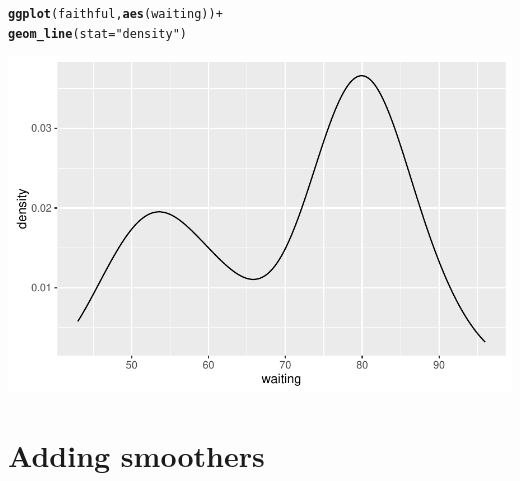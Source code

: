 \documentclass{beamer}\usepackage[]{graphicx}\usepackage[]{color}
\makeatletter
\newcommand{\hlstr}[1]{\textcolor[rgb]{0.192,0.494,0.8}{#1}}%
\newcommand{\hlopt}[1]{\textcolor[rgb]{0,0,0}{#1}}%
\newcommand{\hlstd}[1]{\textcolor[rgb]{0.345,0.345,0.345}{#1}}%
\newcommand{\hlkwc}[1]{\textcolor[rgb]{0.333,0.667,0.333}{#1}}%
\newcommand{\hlkwd}[1]{\textcolor[rgb]{0.737,0.353,0.396}{\textbf{#1}}}%
\newenvironment{kframe}{%
 \def\at@end@of@kframe{}%
 \ifinner\ifhmode%
  \def\at@end@of@kframe{\end{minipage}}%
  \begin{minipage}{\columnwidth}%
 \fi\fi%
 \def\FrameCommand##1{\hskip\@totalleftmargin \hskip-\fboxsep
 \colorbox{shadecolor}{##1}\hskip-\fboxsep
     \hskip-\linewidth \hskip-\@totalleftmargin \hskip\columnwidth}%
 \MakeFramed {\advance\hsize-\width
   \@totalleftmargin\z@ \linewidth\hsize
   \@setminipage}}%
 {\par\unskip\endMakeFramed%
 \at@end@of@kframe}
\newenvironment{knitrout}{}{} %
\makeatother
\begin{document}

\begin{frame}[fragile]
\begin{knitrout}\footnotesize
{}\color{fgcolor}\begin{kframe}
\begin{alltt}
\hlkwd{ggplot}\hlstd{(faithful,} \hlkwd{aes}\hlstd{(waiting))} \hlopt{+}
    \hlkwd{geom_line}\hlstd{(}\hlkwc{stat} \hlstd{=} \hlstr{"density"}\hlstd{)}
\end{alltt}
\end{kframe}

{\centering \includegraphics[width=.75\linewidth]{figure/densitytwo-1} 

}



\end{knitrout}
\end{frame}


\section*{Adding smoothers}
\frame{\sectionpage}

\end{document}
